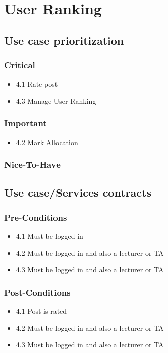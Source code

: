 \documentclass[hidelinks, 12pt, oneside]{article}
\begin{document}
\section{User Ranking}
\subsection{Use case prioritization}
\subsubsection{Critical}
\begin{itemize}
  \item 4.1 Rate post
  \item 4.3 Manage User Ranking
\end{itemize}

\subsubsection{Important}
\begin{itemize}
  \item 4.2 Mark Allocation
\end{itemize}
\subsubsection{Nice-To-Have}


\subsection{Use case/Services contracts}
\subsubsection{Pre-Conditions}								%
\begin{itemize}
  \item 4.1 Must be logged in
  \item 4.2 Must be logged in and also a lecturer or TA
  \item 4.3 Must be logged in and also a lecturer or TA
\end{itemize}

\subsubsection{Post-Conditions}%
\begin{itemize}
  \item 4.1 Post is rated
  \item 4.2 Must be logged in and also a lecturer or TA
  \item 4.3 Must be logged in and also a lecturer or TA
\end{itemize}
\end{document}

